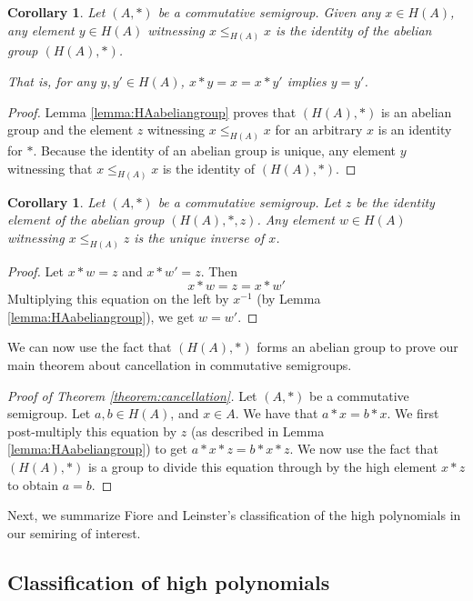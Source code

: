\documentclass{msthesis}
\newtheorem{corollary}[theorem]{Corollary}
\theoremstyle{definition}
\begin{document}
\begin{corollary}\label{cor:uniquez}
    Let $(A, *)$ be a commutative semigroup.  Given any $x \in H(A)$, any element $y \in H(A)$ witnessing $x \le_{H(A)} x$ is the identity of the abelian group $(H(A), *)$.
    
    That is, for any $y,y' \in H(A)$, $x * y = x = x * y'$ implies $y = y'$.
\end{corollary}

\begin{proof}
    Lemma \ref{lemma:HAabeliangroup} proves that $(H(A), *)$ is an abelian group and the element $z$ witnessing $x \le_{H(A)} x$ for an arbitrary $x$ is an identity for $*$.  Because the identity of an abelian group is unique, any element $y$ witnessing that $x \le_{H(A)} x$ is the identity of $(H(A), *)$.
\end{proof}

\begin{corollary}\label{cor:uniqueinverses}
    Let $(A, *)$ be a commutative semigroup.  Let $z$ be the identity element of the abelian group $(H(A), *, z)$.  Any element $w \in H(A)$ witnessing $x \le_{H(A)} z$ is the unique inverse of $x$.
\end{corollary}

\begin{proof}
    Let $x * w = z$ and $x * w' = z$.  Then 
    \[ x * w = z = x * w' \]
    Multiplying this equation on the left by $x^{-1}$ (by Lemma \ref{lemma:HAabeliangroup}), we get $w = w'$.
\end{proof}

We can now use the fact that $(H(A), *)$ forms an abelian group to prove our main theorem about cancellation in commutative semigroups.

\begin{proof}[Proof of Theorem \ref{theorem:cancellation}]
    Let $(A, *)$ be a commutative semigroup.  Let $a, b \in H(A)$, and $x \in A$.  We have that $a * x = b * x$.  We first post-multiply this equation by $z$ (as described in Lemma \ref{lemma:HAabeliangroup}) to get $a * x * z = b * x * z$.  We now use the fact that $(H(A), *)$ is a group to divide this equation through by the high element $x * z$ to obtain $a = b$.  
\end{proof}

Next, we summarize Fiore and Leinster's classification of the high polynomials in our semiring of interest.

\subsection{Classification of high polynomials}\label{subsubsection:highpolynomials}
\end{document}
